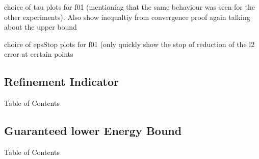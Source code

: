 \begin{frame}
  choice of tau plots for f01 (mentioning that the same behaviour was seen for
  the other experiments). Also show inequaltiy from convergence proof again
  talking about the upper bound
\end{frame}

\begin{frame}
  choice of epsStop plots for f01 (only quickly show the stop of reduction
  of the l2 error at certain points
  
\end{frame}

\subsection{Refinement Indicator}
\begin{frame}[noframenumbering]{Table of Contents}
\end{frame}

\subsection{Guaranteed lower Energy Bound}
\begin{frame}[noframenumbering]{Table of Contents}
\end{frame}

